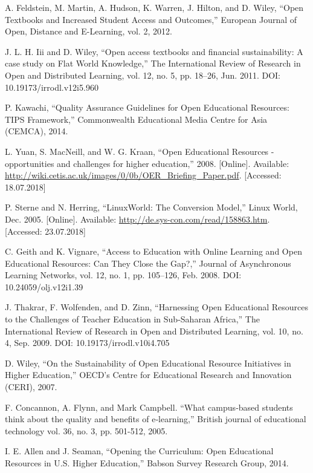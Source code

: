 \documentclass[a4paper]{article}
\begin{document}
\begin{thebibliography}{}
 A. Feldstein, M. Martin, A. Hudson, K. Warren, J. Hilton, and D. Wiley, ``Open Textbooks and Increased Student Access and Outcomes,'' European Journal of Open, Distance and E-Learning, vol. 2, 2012.

 J. L. H. Iii and D. Wiley, ``Open access textbooks and financial sustainability: A case study on Flat World Knowledge,'' The International Review of Research in Open and Distributed Learning, vol. 12, no. 5, pp. 18--26, Jun. 2011. DOI: 10.19173/irrodl.v12i5.960

 P. Kawachi, ``Quality Assurance Guidelines for Open Educational Resources: TIPS Framework,'' Commonwealth Educational Media Centre for Asia (CEMCA), 2014.

 L. Yuan, S. MacNeill, and W. G. Kraan, ``Open Educational Resources - opportunities and challenges for higher education,'' 2008. [Online]. Available: \url{http://wiki.cetis.ac.uk/images/0/0b/OER_Briefing_Paper.pdf}. [Accessed: 18.07.2018]

 P. Sterne and N. Herring, ``LinuxWorld: The Conversion Model,'' Linux World, Dec. 2005. [Online]. Available: \url{http://de.sys-con.com/read/158863.htm}. [Accessed: 23.07.2018]

 C. Geith and K. Vignare, ``Access to Education with Online Learning and Open Educational Resources: Can They Close the Gap?,'' Journal of Asynchronous Learning Networks, vol. 12, no. 1, pp. 105--126, Feb. 2008. DOI: 10.24059/olj.v12i1.39

 J. Thakrar, F. Wolfenden, and D. Zinn, ``Harnessing Open Educational Resources to the Challenges of Teacher Education in Sub-Saharan Africa,'' The International Review of Research in Open and Distributed Learning, vol. 10, no. 4, Sep. 2009. DOI: 10.19173/irrodl.v10i4.705

 D. Wiley, ``On the Sustainability of Open Educational Resource Initiatives in Higher Education,'' OECD’s Centre for Educational Research and Innovation (CERI), 2007.

 F. Concannon, A. Flynn, and Mark Campbell.  ``What campus‐based students think about the quality and benefits of e‐learning,'' British journal of educational technology vol. 36, no. 3, pp. 501-512, 2005.

 I. E. Allen and J. Seaman, ``Opening the Curriculum: Open Educational Resources in U.S. Higher Education,'' Babson Survey Research Group, 2014.


\end{thebibliography}
\end{document}
